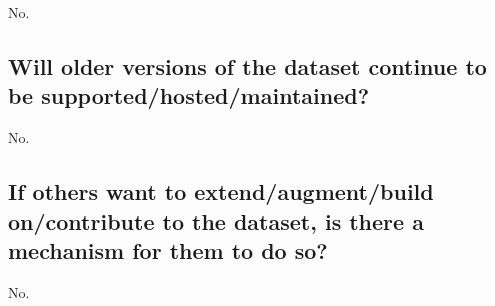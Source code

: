 \documentclass[letterpaper, 10 pt, conference]{ieeeconf}  %
\begin{document}
No.

\subsection{Will older versions of the dataset continue to be supported/hosted/maintained?}

No.

\subsection{If others want to extend/augment/build on/contribute to the dataset, is there a mechanism for them to do so?}

No.

\medskip
 
  

\end{document}
